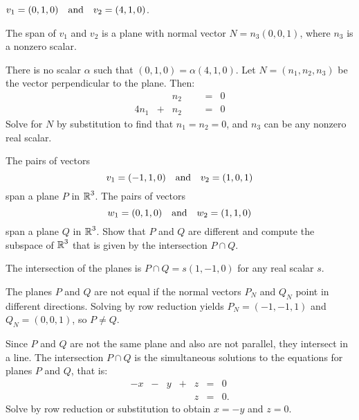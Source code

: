 \documentclass{ximera}
\begin{document}
\begin{exercise} \label{c5.7.1c}
$v_1=(0,1,0) \quad\mbox{and}\quad v_2=(4,1,0)$.

\begin{solution}
\ans The span of $v_1$ and $v_2$ is a plane with normal
vector $N = n_3(0,0,1)$, where $n_3$ is a nonzero scalar.

\soln There is no scalar $\alpha$ such that $(0,1,0) = \alpha(4,1,0)$. 
Let $N = (n_1,n_2,n_3)$ be the vector perpendicular to the plane.  Then:
\[
\begin{array}{rrrrrcl}
& & n_2 & & & = & 0 \\
4n_1 & + & n_2 & & & = & 0 \end{array}
\]
Solve for $N$ by substitution to find that $n_1 = n_2 = 0$, and
$n_3$ can be any nonzero real scalar.

\end{solution}
\end{exercise}

\begin{exercise} \label{c5.7.2}
The pairs of vectors
\[
     v_1=(-1,1,0) \quad\mbox{and}\quad v_2=(1,0,1)
\]
span a plane $P$ in $\mbox{$\Bbb{R}$}^3$.  The pairs of vectors
\[
        w_1=(0,1,0) \quad\mbox{and}\quad w_2=(1,1,0)
\]
span a plane $Q$ in $\mbox{$\Bbb{R}$}^3$.  Show that $P$ and $Q$
are different and compute the subspace of $\mbox{$\Bbb{R}$}^3$ that
is given by the intersection $P\cap Q$.

\begin{solution}

\ans The intersection of the planes is $P \cap Q = s(1,-1,0)$ for any
real scalar $s$.

\soln The planes $P$ and $Q$ are not equal if the normal vectors $P_N$
and $Q_N$ point in different directions.  Solving by row reduction
yields $P_N = (-1,-1,1)$ and $Q_N = (0,0,1)$, so $P \neq Q$.

\para Since $P$ and $Q$ are not the same plane and also are not
parallel, they intersect in a line.  The intersection $P \cap Q$ is
the simultaneous solutions to the equations for planes $P$ and $Q$,
that is:
\[ \begin{array}{rrrrrrl}
-x & - & y & + & z & = & 0 \\
& & & & z & = & 0. \end{array} \]
Solve by row reduction or substitution to obtain $x = -y$ and $z = 0$.

\end{solution}
\end{exercise}
\end{document}
